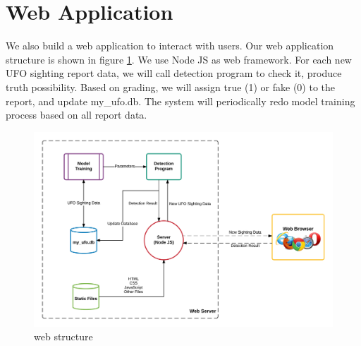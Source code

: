 \section{Web Application}\label{methodology}

We also build a web application to interact with users. Our web application structure is shown in figure \ref{structure}. We use Node JS as web framework. For each new UFO sighting report data, we will call detection program to check it, produce truth possibility. Based on grading, we will assign true (1) or fake (0) to the report, and update my\_ufo.db. The system will periodically redo model training process based on all report data.

\begin{figure}[H]
    \centering
    \includegraphics[width=12cm]{figure/structure.png}
    \caption{web structure}
    \label{structure}
\end{figure}

